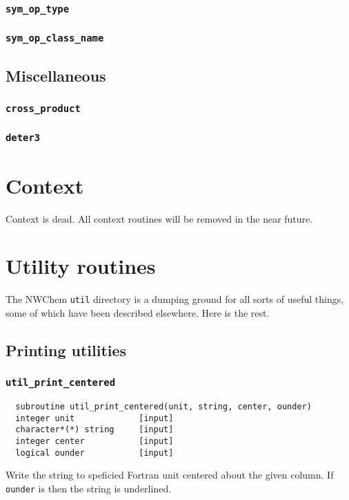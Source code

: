\subsubsection{{\tt sym\_op\_type}}

\subsubsection{{\tt sym\_op\_class\_name}}

\subsection{Miscellaneous}

\subsubsection{{\tt cross\_product}}

\subsubsection{{\tt deter3}}


\section{Context}

Context is dead.  All context routines will be removed in the near
future.


\section{Utility routines}

The NWChem {\tt util} directory is a dumping ground for all sorts of useful
things, some of which have been described elsewhere.  Here is the rest.

\subsection{Printing utilities}

\subsubsection{{\tt util\_print\_centered}}
\begin{verbatim}
  subroutine util_print_centered(unit, string, center, ounder)
  integer unit             [input]
  character*(*) string     [input]
  integer center           [input]
  logical ounder           [input]
\end{verbatim}
Write the string to speficied Fortran unit centered about the given
column.  If {\tt ounder} is \TRUE then the string is underlined.

